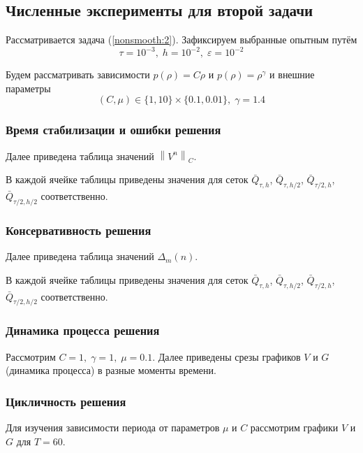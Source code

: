 \subsection{Численные эксперименты для второй задачи}

Рассматривается задача (\ref{nonsmooth:2}).
Зафиксируем выбранные опытным путём
$$ \tau = 10^{-3}, \; h = 10^{-2}, \; \varepsilon = 10^{-2}$$

Будем рассматривать зависимости 
$ p(\rho) = C \rho $ и $p(\rho) = \rho^{\gamma}$
и внешние параметры 
$$ (C, \mu) \in \{1, 10\} \times \{0.1, 0.01\}, \; \gamma = 1.4$$


\subsubsection{Время стабилизации и ошибки решения}
Далее приведена таблица значений $\left\|V^{n}\right\|_C$. 

В каждой ячейке таблицы приведены значения для сеток
$ \bar Q_{\tau, h} $, $ \bar Q_{\tau, h/2} $, 
$ \bar Q_{\tau/2, h} $, $ \bar Q_{\tau/2, h/2} $ соответственно.


\newpage



\subsubsection{Консервативность решения}
Далее приведена таблица значений $\Delta_{m}(n)$. 

В каждой ячейке таблицы приведены значения для сеток
$ \bar Q_{\tau, h} $, $ \bar Q_{\tau, h/2} $, 
$ \bar Q_{\tau/2, h} $, $ \bar Q_{\tau/2, h/2} $ соответственно.


\newpage



\subsubsection{Динамика процесса решения}
Рассмотрим $C = 1, \; \gamma = 1, \; \mu = 0.1$.
Далее приведены срезы графиков $V$ и $G$ (динамика процесса) в разные моменты времени.



\subsubsection{Цикличность решения}
Для изучения зависимости периода от параметров $\mu$ и $C$ 
рассмотрим графики $V$ и $G$ для $T = 60$.
